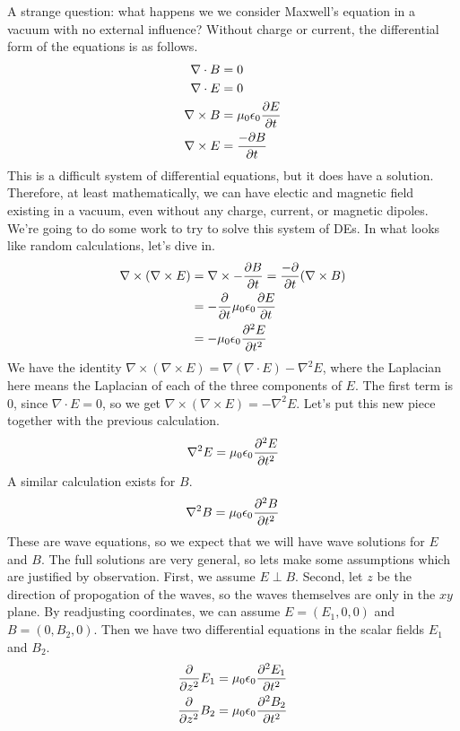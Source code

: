 \documentclass[fleqn,letterpaper]{report}
\begin{document}
A strange question: what happens we we consider Maxwell's
equation in a vacuum with no external influence? Without
charge or current, the differential form of the equations is
as follows.
\begin{align*}
\nabla \cdot B & = 0 \\
\nabla \cdot E & = 0 \\
\nabla \times B & = \mu_0 \epsilon_0 \frac{\partial E}{ \partial t} \\
\nabla \times E & = \frac{-\partial B}{\partial t}
\end{align*}
This is a difficult system of differential equations, but it
does have a solution. Therefore, at least mathematically, we
can have electic and magnetic field existing in a vacuum, even
without any charge, current, or magnetic dipoles. We're going
to do some work to try to solve this system of DEs. In what
looks like random calculations, let's dive in.
\begin{align*}
\nabla \times (\nabla \times E) & = \nabla \times -\frac{\partial
B}{\partial t} = \frac{-\partial}{\partial t} (\nabla \times B) \\
& = - \frac{\partial}{\partial t} \mu_0 \epsilon_0 \frac{\partial E}{\partial
t} \\
& = -\mu_0 \epsilon_0 \frac{\partial^2 E}{\partial t^2} 
\end{align*}
We have the identity $\nabla \times (\nabla \times E) = \nabla
(\nabla \cdot E) - \nabla^2 E$, where the Laplacian here means
the Laplacian of each of the three components of $E$. The
first term is $0$, since $\nabla \cdot E =0$, so we get
$\nabla \times( \nabla \times E) = -\nabla^2 E$. Let's put
this new piece together with the previous calculation.
\begin{equation*}
\nabla^2 E = \mu_0 \epsilon_0 \frac{\partial^2 E}{\partial t^2} 
\end{equation*}
A similar calculation exists for $B$.
\begin{equation*}
\nabla^2 B = \mu_0 \epsilon_0 \frac{\partial^2 B}{\partial t^2} 
\end{equation*}
These are wave equations, so we expect that we will have wave
solutions for $E$ and $B$. The full solutions are very
general, so lets make some assumptions which are justified by
observation. First, we assume $E \perp B$. Second, let
$z$ be the direction of propogation of the waves, so the waves
themselves are only in the $xy$ plane. By readjusting
coordinates, we can assume $E = (E_1,0,0)$ and $B = (0,
B_2,0)$. Then we have two differential equations in the scalar
fields $E_1$ and $B_2$.
\begin{align*}
\frac{\partial}{\partial z^2} E_1 & = \mu_0 \epsilon_0 \frac{\partial^2
E_1}{\partial t^2} \\
\frac{\partial}{\partial z^2} B_2 & = \mu_0 \epsilon_0 \frac{\partial^2
B_2}{\partial t^2} 
\end{align*}
\end{document}
